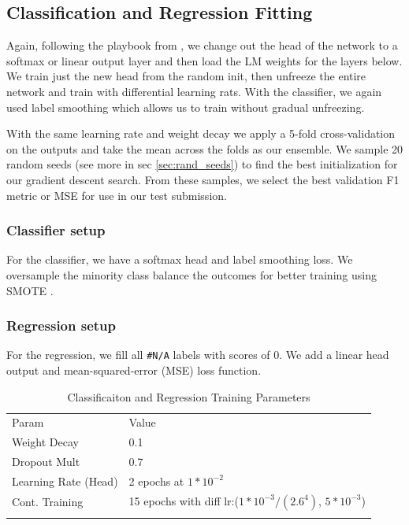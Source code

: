 \documentclass[smallcondensed]{svjour3}     %
\begin{document}
\subsection{Classification and Regression Fitting}
Again, following the playbook from \cite{HowardRuder:DBLP:journals/corr/abs-1801-06146}, we change out the head of the network to a softmax or linear output layer and then load the LM weights for the layers below.  We train just the new head from the random init, then unfreeze the entire network and train with differential learning rats.  With the classifier, we again used label smoothing which allows us to train without gradual unfreezing.  

With the same learning rate and weight decay we apply a 5-fold cross-validation on the outputs and take the mean across the folds as our ensemble.  We sample 20 random seeds (see more in sec \ref{sec:rand_seeds}) to find the best initialization for our gradient descent search.  From these samples, we select the best validation F1 metric or MSE for use in our test submission.
\subsubsection{Classifier setup}  For the classifier, we have a softmax head and label smoothing loss.  We oversample the minority class balance the outcomes for better training using SMOTE \cite{Chawla:2002:SSM:1622407.1622416}.  
\subsubsection{Regression setup}  For the regression, we fill all \verb|#N/A| labels with scores of 0.  We add a linear head output and mean-squared-error (MSE) loss function. 

\begin{table}[ht]
	\caption{Classificaiton and Regression Training Parameters}
	\label{tab:clas_training}       %
	\begin{tabular}{ll}
		\hline\noalign{\smallskip}
		Param & Value \\
		\noalign{\smallskip}\hline\noalign{\smallskip}
		Weight Decay & 0.1  \\
		Dropout Mult &  0.7 \\
		Learning Rate (Head)& 2 epochs at $1*10^{-2}$\\
		Cont. Training & 15 epochs with diff lr:($1*10^{-3}/(2.6^4)$, $5*10^{-3}$)\\
		\noalign{\smallskip}\hline
	\end{tabular}
\end{table}
\end{document}
